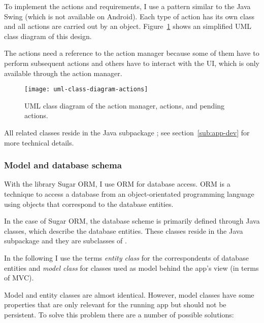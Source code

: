 To implement the actions and requirements, I use a pattern similar to the Java
Swing
\href{https://docs.oracle.com/javase/8/docs/api/javax/swing/undo/UndoManager.html}{}
(which is not available on Android). Each type of
action has its own class and all actions are carried out by an
 object. Figure~\ref{fig:uml-class-diagram-actions} shows an
simplified \acs{UML} class diagram of this design.

The actions need a reference to the action manager because some of them have to
perform subsequent actions and others have to interact with the \acs{UI}, which
is only available through the action manager.

\begin{figure}[htb]
  \centering
  \texttt{[image: uml-class-diagram-actions]}
\caption[\acs{UML} class diagram of actions.]%
{\acs{UML} class diagram of the action manager, actions, and pending actions.}
\label{fig:uml-class-diagram-actions}
\end{figure}

All related classes reside in the Java subpackage ;
see section~\ref{sub:app-dev} for more technical details.

\subsubsection{Model and database schema}
\label{subsubsec:model-and-db-schema}

With the library Sugar ORM, I use \acf{ORM} for database access.
\acs{ORM} is a technique to access a database from an object-orientated
programming language using objects that correspond to the database entities.

In the case of Sugar ORM, the database scheme is primarily defined through Java
classes, which describe the database entities.
These classes reside in the Java subpackage  and they are
subclasses of .

In the following I use the terms \emph{entity class} for the correspondents of
database entities and \emph{model class} for classes used as model behind the app's
view (in terms of \acs{MVC}).

Model and entity classes are almost identical.
However, model classes have some properties that are only relevant for the
running app but should not be persistent.
To solve this problem there are a number of possible solutions:

